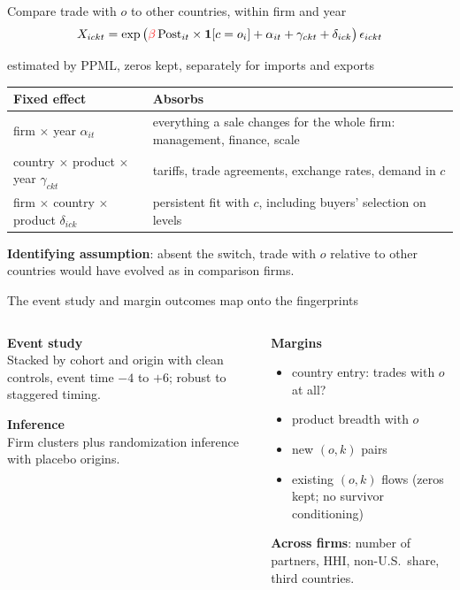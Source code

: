 \documentclass[notes,11pt, aspectratio=169]{beamer}
\newcommand{\Post}{\mathrm{Post}}
\begin{document}
\begin{frame}{Compare trade with $o$ to other countries, within firm and year}
\[
X_{ickt}=\exp\big(\textcolor{red}{\beta}\,\Post_{it}\times\mathbbm{1}[c=o_i]+\alpha_{it}+\gamma_{ckt}+\delta_{ick}\big)\,\epsilon_{ickt}
\]
\vspace{-0.3cm}
\begin{center}\small estimated by PPML, zeros kept, separately for imports and exports\end{center}
\footnotesize
\renewcommand{\arraystretch}{1.25}
\begin{tabularx}{\textwidth}{@{}p{4.6cm}Y@{}}
\toprule
\textbf{Fixed effect} & \textbf{Absorbs}\\
\midrule
firm $\times$ year $\alpha_{it}$ & everything a sale changes for the whole firm: management, finance, scale\\
country $\times$ product $\times$ year $\gamma_{ckt}$ & tariffs, trade agreements, exchange rates, demand in $c$\\
firm $\times$ country $\times$ product $\delta_{ick}$ & persistent fit with $c$, including buyers' selection on levels\\
\bottomrule
\end{tabularx}
\vspace{0.2cm}

\small
\textbf{Identifying assumption}: absent the switch, trade with $o$ relative to other countries would have evolved as in comparison firms.
\end{frame}


\begin{frame}{The event study and margin outcomes map onto the fingerprints}
\begin{columns}[T]
\begin{column}{0.47\textwidth}
\textbf{Event study}\\
{\small Stacked by cohort and origin with clean controls, event time $-4$ to $+6$; robust to staggered timing.}

\textbf{Inference}\\
{\small Firm clusters plus randomization inference with placebo origins.}
\end{column}
\begin{column}{0.47\textwidth}
\textbf{Margins}
\begin{itemize}\setlength{\itemsep}{2pt}\small
\item country entry: trades with $o$ at all?
\item product breadth with $o$
\item new $(o,k)$ pairs
\item existing $(o,k)$ flows {\scriptsize(zeros kept; no survivor conditioning)}
\end{itemize}
\textbf{Across firms}: {\small number of partners, HHI, non-U.S.\ share, third countries.}
\end{column}
\end{columns}
\vspace{0.2cm}
\hyperlink{fingerprints}{}
\end{frame}
\end{document}
